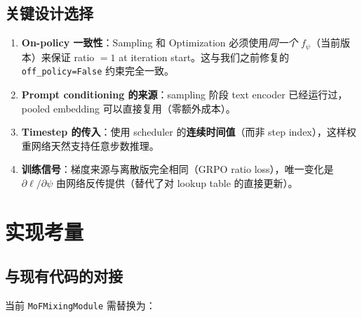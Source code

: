 \documentclass[11pt,a4paper]{article}
\theoremstyle{definition}
\begin{document}
\subsection{关键设计选择}

\begin{enumerate}[leftmargin=2em]
\item \textbf{On-policy 一致性}：Sampling 和 Optimization 必须使用\emph{同一个} $f_\psi$（当前版本）来保证 ratio $= 1$ at iteration start。这与我们之前修复的 \texttt{off\_policy=False} 约束完全一致。

\item \textbf{Prompt conditioning 的来源}：sampling 阶段 text encoder 已经运行过，pooled embedding 可以直接复用（零额外成本）。

\item \textbf{Timestep 的传入}：使用 scheduler 的\textbf{连续时间值}（而非 step index），这样权重网络天然支持任意步数推理。

\item \textbf{训练信号}：梯度来源与离散版完全相同（GRPO ratio loss），唯一变化是 $\partial \ell / \partial \psi$ 由网络反传提供（替代了对 lookup table 的直接更新）。
\end{enumerate}


\section{实现考量}

\subsection{与现有代码的对接}

当前 \texttt{MoFMixingModule} 需替换为：
\end{document}
